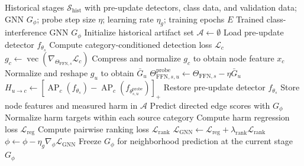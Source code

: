 \documentclass[10pt]{article}
\begin{document}
\begin{algorithm}[t]
\caption{Training the Class-Interference GNN}
\label{alg:gnn_training}
\begin{algorithmic}[1]
\Require Historical stages $\mathcal{S}_{\mathrm{hist}}$ with pre-update
detectors, class data, and validation data; GNN $G_\phi$;
probe step size $\eta$; learning rate $\eta_g$; training epochs $E$
\Ensure Trained class-interference GNN $G_\phi$
\State Initialize historical artifact set $\mathcal{A}\gets\emptyset$
    \State Load pre-update detector $f_{\theta_s}$
        \State Compute category-conditioned detection loss $\mathcal{L}_c$
        \State $g_c\gets\operatorname{vec}(\nabla_{\Theta_{\mathrm{FFN},s}}\mathcal{L}_c)$
        \State Compress and normalize $g_c$ to obtain node feature $x_c$
    \EndFor
        \State Normalize and reshape $g_u$ to obtain $\bar{G}_u$
        \State $\Theta_{\mathrm{FFN},s,u}^{\mathrm{probe}}
        \gets\Theta_{\mathrm{FFN},s}-\eta\bar{G}_u$
            \State $H_{u\rightarrow c}\gets
            [\operatorname{AP}_c(f_{\theta_s})-
            \operatorname{AP}_c(f_{\theta_{s,u}^{\mathrm{probe}}})]_+$
        \EndFor
        \State Restore pre-update detector $f_{\theta_s}$
    \EndFor
    \State Store node features and measured harm in $\mathcal{A}$
\EndFor
{}
        \State Predict directed edge scores with $G_\phi$
        \State Normalize harm targets within each source category
        \State Compute harm regression loss $\mathcal{L}_{\mathrm{reg}}$
        \State Compute pairwise ranking loss $\mathcal{L}_{\mathrm{rank}}$
        \State $\mathcal{L}_{\mathrm{GNN}}\gets
        \mathcal{L}_{\mathrm{reg}}+
        \lambda_{\mathrm{rank}}\mathcal{L}_{\mathrm{rank}}$
        \State $\phi\gets\phi-\eta_g\nabla_\phi\mathcal{L}_{\mathrm{GNN}}$
    \EndFor
\EndFor
\State Freeze $G_\phi$ for neighborhood prediction at the current stage
\State \Return $G_\phi$
\end{algorithmic}
\end{algorithm}
\end{document}
